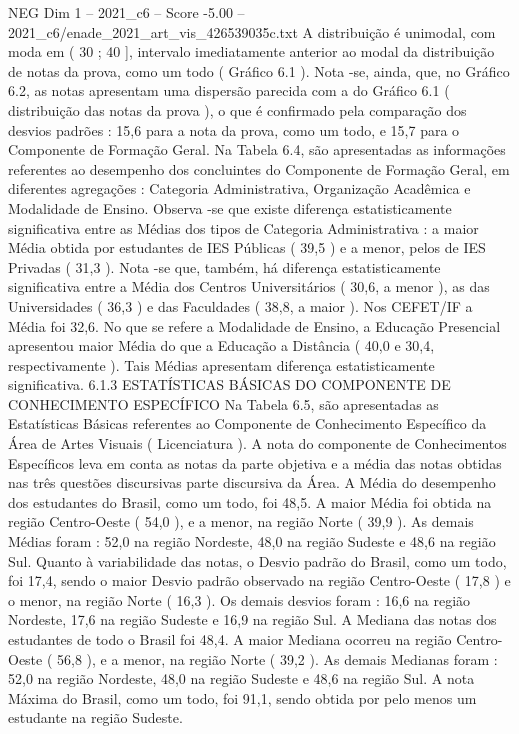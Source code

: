 \begin{textsample}{NEG Dim 1 – 2021\_c6 – Score -5.00 – 2021\_c6/enade\_2021\_art\_vis\_426539035c.txt}
A distribuição é unimodal, com moda em ( 30 ; 40 ], intervalo imediatamente anterior ao modal da distribuição de notas da prova, como um todo ( Gráfico 6.1 ).
Nota -se, ainda, que, no Gráfico 6.2, as notas apresentam uma dispersão parecida com a do Gráfico 6.1 ( distribuição das notas da prova ), o que é confirmado pela comparação dos desvios padrões : 15,6 para a nota da prova, como um todo, e 15,7 para o Componente de Formação Geral.
Na Tabela 6.4, são apresentadas as informações referentes ao desempenho dos concluintes do Componente de Formação Geral, em diferentes agregações : Categoria Administrativa, Organização Acadêmica e Modalidade de Ensino.
Observa -se que existe diferença estatisticamente significativa entre as Médias dos tipos de Categoria Administrativa : a maior Média obtida por estudantes de IES Públicas ( 39,5 ) e a menor, pelos de IES Privadas ( 31,3 ).
Nota -se que, também, há diferença estatisticamente significativa entre a Média dos Centros Universitários ( 30,6, a menor ), as das Universidades ( 36,3 ) e das Faculdades ( 38,8, a maior ).
Nos CEFET/IF a Média foi 32,6.
No que se refere a Modalidade de Ensino, a Educação Presencial apresentou maior Média do que a Educação a Distância ( 40,0 e 30,4, respectivamente ).
Tais Médias apresentam diferença estatisticamente significativa. 6.1.3 ESTATÍSTICAS BÁSICAS DO COMPONENTE DE CONHECIMENTO ESPECÍFICO Na Tabela 6.5, são apresentadas as Estatísticas Básicas referentes ao Componente de Conhecimento Específico da Área de Artes Visuais ( Licenciatura ).
A nota do componente de Conhecimentos Específicos leva em conta as notas da parte objetiva e a média das notas obtidas nas três questões discursivas parte discursiva da Área.
A Média do desempenho dos estudantes do Brasil, como um todo, foi 48,5.
A maior Média foi obtida na região Centro-Oeste ( 54,0 ), e a menor, na região Norte ( 39,9 ).
As demais Médias foram : 52,0 na região Nordeste, 48,0 na região Sudeste e 48,6 na região Sul.
Quanto à variabilidade das notas, o Desvio padrão do Brasil, como um todo, foi 17,4, sendo o maior Desvio padrão observado na região Centro-Oeste ( 17,8 ) e o menor, na região Norte ( 16,3 ).
Os demais desvios foram : 16,6 na região Nordeste, 17,6 na região Sudeste e 16,9 na região Sul.
A Mediana das notas dos estudantes de todo o Brasil foi 48,4.
A maior Mediana ocorreu na região Centro-Oeste ( 56,8 ), e a menor, na região Norte ( 39,2 ).
As demais Medianas foram : 52,0 na região Nordeste, 48,0 na região Sudeste e 48,6 na região Sul.
A nota Máxima do Brasil, como um todo, foi 91,1, sendo obtida por pelo menos um estudante na região Sudeste.

\end{textsample}
